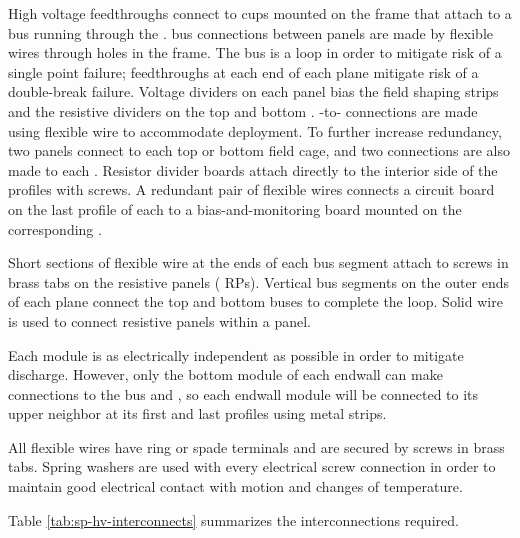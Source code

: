 High voltage feedthroughs connect to cups mounted on the  frame
that attach to a  bus running through the .   bus connections
between  panels are made by flexible wires through holes in the
 frame. The  bus is a loop in order to mitigate risk of a single
point failure; feedthroughs at each end of each  plane mitigate
risk of a double-break failure.  Voltage dividers on each  panel
bias the field shaping strips and the resistive dividers on the top
and bottom .  -to- connections are made using
flexible wire to accommodate  deployment.  To further
increase redundancy, two  panels connect to each top or bottom
field cage, and two connections are also made to each . Resistor divider boards attach directly to the interior side of
the  profiles with screws.   A redundant pair of flexible wires
connects a circuit board on the last profile of each  to a
bias-and-monitoring board mounted on the corresponding .

Short sections of flexible wire at the ends of each  bus segment
attach to screws in brass tabs on the  resistive panels ( RPs).
Vertical  bus segments on the outer ends of each  plane connect
the top and bottom  buses to complete the loop.  Solid wire is used
to connect resistive panels within a  panel.

Each  module is as electrically independent as possible in order to
mitigate discharge.  However, only the bottom module of each endwall
can make connections to the  bus and , so each endwall module
will be connected to its upper neighbor at its first and last profiles
using metal strips.

All flexible wires have ring or spade terminals and are secured by
screws in brass tabs.  Spring washers are used with every electrical
screw connection in order to maintain good electrical contact with
motion and changes of temperature.

Table \ref{tab:sp-hv-interconnects} summarizes the interconnections
required.

